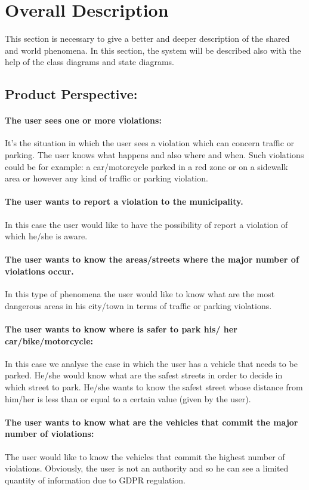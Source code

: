 \documentclass[titlepage]{article}
\begin{document}
\section{Overall Description}
This section is necessary to give a better and deeper description of the shared and world phenomena. In this section, the system will be described also with the help of the class diagrams and state diagrams.
\subsection{Product Perspective:}
\paragraph{The user sees one or more violations:}
It's the situation in which the user sees a violation which can concern traffic or parking. The user knows what happens and also where and when. Such violations could be for example: a car/motorcycle parked in a red zone or on a sidewalk area or however any kind of traffic or parking violation.
\paragraph{The user wants to report a violation to the 					  municipality.}
In this case the user would like to have the possibility of report a violation of which he/she is aware. 
\paragraph{The user wants to know the areas/streets where the 
	      major number of violations occur.}
In this type of phenomena the user would like to know what are the most dangerous areas in his city/town in terms of traffic or parking violations. 
\paragraph{The user wants to know where is safer to park his/			  her car/bike/motorcycle:}
In this case we analyse the case in which the user has a vehicle that needs to be parked. He/she would know what are the safest streets in order to decide in which street to park. He/she wants to know the safest street whose distance from him/her is less than or equal to a certain value (given by the user).
\paragraph{The user wants to know what are the vehicles that       		  commit the major number of violations:}
The user would like to know the vehicles that commit the highest number of violations. Obviously, the user is not an authority and so he can see a limited quantity of information due to GDPR regulation.
\end{document}
